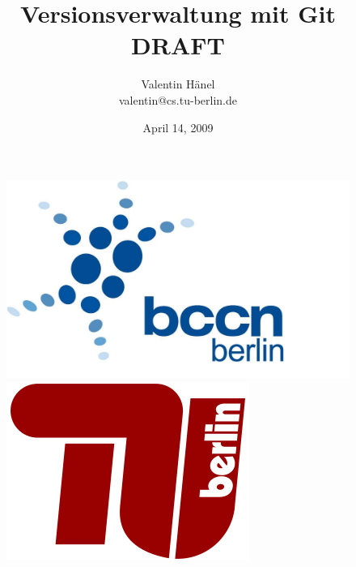 \documentclass[ hyperref={colorlinks=true,filecolor=blue}]{beamer}
\author{Valentin H\"anel\\
        valentin@cs.tu-berlin.de}
\institute{Technische Universität Berlin \\
Bernstein Center for Computational Neuroscience Berlin}
\title{Versionsverwaltung mit Git \\DRAFT}
\date{April 14, 2009}
\begin{document}

\begin{frame}
	\titlepage
    \begin{figure}
	\includegraphics[scale=0.05]{BCCN_logo_berlin.pdf}
	\includegraphics[scale=0.14]{tu_logo.png}
\end{figure}

\end{frame}


\end{document}
